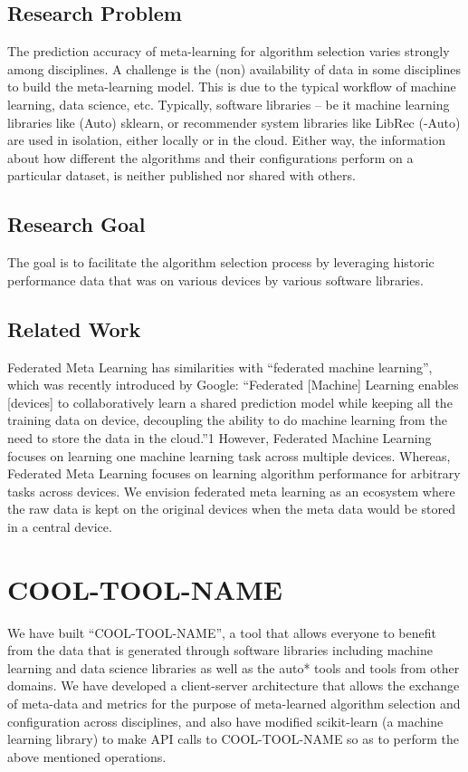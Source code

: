 \documentclass{article}
\begin{document}
\subsection{Research Problem}
The prediction accuracy of meta-learning for algorithm selection varies strongly among disciplines. A challenge is the (non) availability of data in some disciplines to build the meta-learning model. This is due to the typical workflow of machine learning, data science, etc. Typically, software libraries – be it machine learning libraries like (Auto) sklearn, or recommender system libraries like LibRec (-Auto) are used in isolation, either locally or in the cloud. Either way, the information about how different the algorithms and their configurations perform on a particular dataset, is neither published nor shared with others.

\subsection{Research Goal}
The goal is to facilitate the algorithm selection process by leveraging historic performance data that was on various devices by various software libraries.

\subsection{Related Work}
Federated Meta Learning has similarities with “federated machine learning”, which was recently introduced by Google: “Federated [Machine] Learning enables [devices] to collaboratively learn a shared prediction model while keeping all the training data on device, decoupling the ability to do machine learning from the need to store the data in the cloud.”1 However, Federated Machine Learning focuses on learning one machine learning task across multiple devices. Whereas, Federated Meta Learning focuses on learning algorithm performance for arbitrary tasks across devices. We envision federated meta learning as an ecosystem where the raw data is kept on the original devices when the meta data would be stored in a central device. 


\section{COOL-TOOL-NAME}
We have built “COOL-TOOL-NAME”, a tool that allows everyone to benefit from the data that is generated through software libraries including machine learning and data science libraries as well as the auto* tools and tools from other domains. We have developed a client-server architecture that allows the exchange of meta-data and metrics for the purpose of meta-learned algorithm selection and configuration across disciplines, and also have modified scikit-learn (a machine learning library) to make API calls to COOL-TOOL-NAME so as to perform the above mentioned operations.
\end{document}

